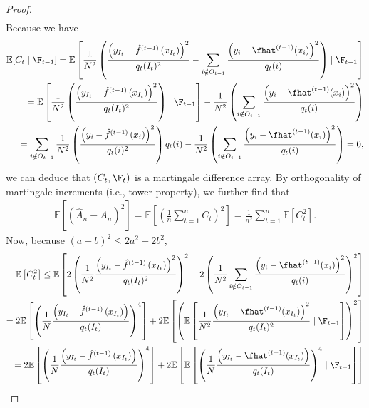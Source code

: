\documentclass[11pt]{article}
\begin{document}
\begin{proof}
\begin{align*}
    \end{align*}
    Because we have
    \begin{align*}
        \mathbb{E}[C_t \mid \F_{t-1}] = \mathbb{E}\left[ \frac{1}{N^2}\left( \frac{\left( y_{I_t} - \hat{f}^{(t-1)}\left( x_{I_t} \right) \right)^2}{q_t(I_t)^2} - \sum_{i \notin O_{t-1}} \frac{\left( y_i - \fhat^{(t-1)}(x_i) \right)^2}{q_t(i)} \right) \mid \F_{t-1} \right]\\
        = \mathbb{E}\left[ \frac{1}{N^2}\left( \frac{\left( y_{I_t} - \hat{f}^{(t-1)}\left( x_{I_t} \right) \right)^2}{q_t(I_t)^2} \right) \mid \F_{t-1} \right] - \frac{1}{N^2} \left( \sum_{i \notin O_{t-1}} \frac{\left( y_i - \fhat^{(t-1)}(x_i) \right)^2}{q_t(i)} \right)\\
        = \sum_{i \notin O_{t-1}} \frac{1}{N^2}\left( \frac{\left( y_{i} - \hat{f}^{(t-1)}\left( x_{i} \right) \right)^2}{q_t(i)^2} \right) q_t(i) - \frac{1}{N^2} \left( \sum_{i \notin O_{t-1}} \frac{\left( y_i - \fhat^{(t-1)}(x_i) \right)^2}{q_t(i)} \right) = 0,
    \end{align*}
    we can deduce that $(C_t, \F_t)$ is a martingale difference array. By orthogonality of martingale increments (i.e., tower property), we further find that
    \begin{align*}
        \mathbb{E}\left[ \left( \hat{A}_n - A_n \right)^2 \right] = \mathbb{E}\left[ \left( \frac{1}{n} \sum_{t=1}^n C_t \right)^2 \right] = \frac{1}{n^2} \sum_{t=1}^n \mathbb{E}\left[ C_t^2 \right].
    \end{align*}
    Now, because $(a-b)^2 \leq 2a^2 + 2b^2$,
    \begin{align*}
        \mathbb{E}\left[ C_t^2 \right] \leq \mathbb{E}\left[ 2 \left( \frac{1}{N^2} \frac{\left( y_{I_t} - \hat{f}^{(t-1)}\left( x_{I_t} \right) \right)^2}{q_t(I_t)^2} \right)^2 + 2 \left( \frac{1}{N^2} \sum_{i \notin O_{t-1}} \frac{\left( y_i - \fhat^{(t-1)}(x_i) \right)^2}{q_t(i)}\right)^2\right]\\
        = 2 \mathbb{E}\left[ \left( \frac{1}{N} \frac{\left( y_{I_t} - \hat{f}^{(t-1)}\left( x_{I_t} \right) \right)}{q_t(I_t)} \right)^4\right] + 2 \mathbb{E}\left[ \left( \mathbb{E}\left[ \frac{1}{N^2} \frac{\left( y_{I_t} - \fhat^{(t-1)}(x_{I_t}) \right)^2}{q_t({I_t})^2} \mid \F_{t-1} \right]\right)^2 \right]\\
        = 2 \mathbb{E}\left[ \left( \frac{1}{N} \frac{\left( y_{I_t} - \hat{f}^{(t-1)}\left( x_{I_t} \right) \right)}{q_t(I_t)} \right)^4\right] + 2 \mathbb{E}\left[ \mathbb{E}\left[ \left( \frac{1}{N} \frac{\left( y_{I_t} - \fhat^{(t-1)}(x_{I_t}) \right)}{q_t({I_t})} \right)^4 \mid \F_{t-1} \right] \right]\\

\end{align*}
\end{proof}
\end{document}
